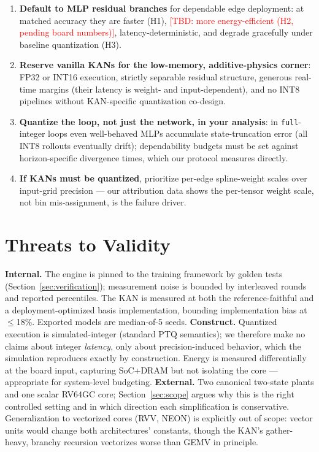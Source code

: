\documentclass[conference]{IEEEtran}
\newcommand{\tbd}[1]{\textcolor{red}{[TBD: #1]}}
\begin{document}
\begin{enumerate}
\item \textbf{Default to MLP residual branches} for dependable edge
deployment: at matched accuracy they are faster (H1), \tbd{more
energy-efficient (H2, pending board numbers)}, latency-deterministic, and
degrade gracefully under baseline quantization (H3).
\item \textbf{Reserve vanilla KANs for the low-memory, additive-physics
corner}: FP32 or INT16 execution, strictly separable residual structure,
generous real-time margins (their latency is weight- and input-dependent),
and no INT8 pipelines without KAN-specific quantization co-design.
\item \textbf{Quantize the loop, not just the network, in your analysis}: in
\texttt{full}-integer loops even well-behaved MLPs accumulate state-truncation
error (all INT8 rollouts eventually drift); dependability budgets must be set
against horizon-specific divergence times, which our protocol measures
directly.
\item \textbf{If KANs must be quantized}, prioritize per-edge spline-weight
scales over input-grid precision --- our attribution data shows the
per-tensor weight scale, not bin mis-assignment, is the failure driver.
\end{enumerate}

\section{Threats to Validity}
\label{sec:threats}

\textbf{Internal.} The engine is pinned to the training framework by golden
tests (Section~\ref{sec:verification}); measurement noise is bounded by
interleaved rounds and reported percentiles. The KAN is measured at both the
reference-faithful and a deployment-optimized basis implementation, bounding
implementation bias at $\leq$18\%. Exported models are median-of-5 seeds.
\textbf{Construct.} Quantized execution is simulated-integer (standard PTQ
semantics); we therefore make no claims about integer \emph{latency}, only
about precision-induced behavior, which the simulation reproduces exactly by
construction. Energy is measured differentially at the board input, capturing
SoC+DRAM but not isolating the core --- appropriate for system-level
budgeting. \textbf{External.} Two canonical two-state plants and one scalar
RV64GC core; Section~\ref{sec:scope} argues why this is the right controlled
setting and in which direction each simplification is conservative.
Generalization to vectorized cores (RVV, NEON) is explicitly out of scope:
vector units would change both architectures' constants, though the KAN's
gather-heavy, branchy recursion vectorizes worse than GEMV in principle.
\end{document}
